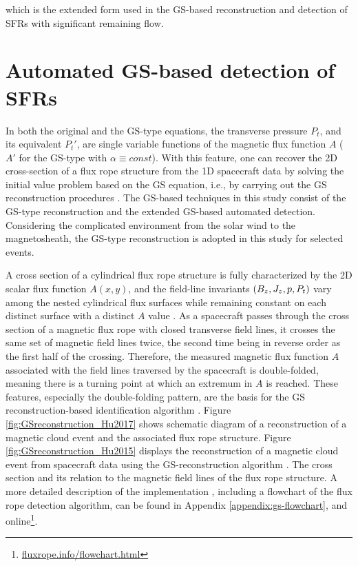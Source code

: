 which is the extended form used in the GS-based reconstruction and detection of SFRs with significant remaining flow.

\section{Automated GS-based detection of SFRs}\label{sec:GS-detection}
In both the original and the GS-type equations, the transverse pressure $P_t$, and its equivalent $P_t'$, are single variable functions of the magnetic flux function $A$ ($A'$ for the GS-type with $\alpha\equiv const$). With this feature, one can recover the 2D cross-section of a flux rope structure from the 1D spacecraft data by solving the initial value problem based on the GS equation, i.e., by carrying out the GS reconstruction procedures \citep{Hau:1999, HuSonnerup:2002, Hu:2017}. The GS-based techniques in this study consist of the GS-type reconstruction and the extended GS-based automated detection. Considering the complicated environment from the solar wind to the magnetosheath, the GS-type reconstruction is adopted in this study for selected events.

A cross section of a cylindrical flux rope structure is fully characterized by the 2D scalar flux function $A(x, y)$, and the field-line invariants $\left( B_z,J_z,p, P_t \right)$ vary among the nested cylindrical flux surfaces while remaining constant on each distinct surface with a distinct $A$ value \citep{Hu:2018}. As a spacecraft passes through the cross section of a magnetic flux rope with closed transverse field lines, it crosses the same set of magnetic field lines twice, the second time being in reverse order as the first half of the crossing. Therefore, the measured magnetic flux function $A$ associated with the field lines traversed by the spacecraft is double-folded, meaning there is a turning point at which an extremum in $A$ is reached. These features, especially the double-folding pattern, are the basis for the GS reconstruction-based identification algorithm \citep{Hu:2018}. Figure \ref{fig:GSreconstruction_Hu2017} shows schematic diagram of a reconstruction of a magnetic cloud event and the associated flux rope structure. Figure \ref{fig:GSreconstruction_Hu2015} displays the reconstruction of a magnetic cloud event from spacecraft data using the GS-reconstruction algorithm \citep{Hu:2015,Hu:2018}. The cross section and its relation to the magnetic field lines of the flux rope structure. A more detailed description of the implementation \citep{Hu:2018}, including a flowchart of the flux rope detection algorithm, can be found in Appendix \ref{appendix:gs-flowchart}, and online\footnote{\url{fluxrope.info/flowchart.html}}.

